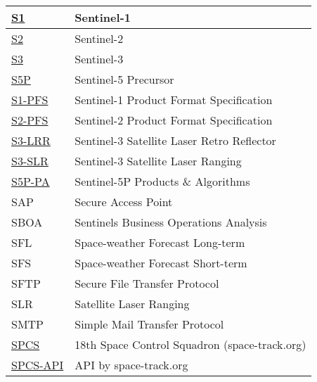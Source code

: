 \documentclass[dec_sum_main.tex]{subfiles}
\begin{document}
\begin{longtable}{|m{2.8cm}|m{10cm}|}
	\href{https://sentinels.copernicus.eu/web/sentinel/missions/sentinel-1}{S1} & Sentinel-1 \\ \hline
	\href{https://sentinels.copernicus.eu/web/sentinel/missions/sentinel-2}{S2} & Sentinel-2 \\ \hline
	\href{https://sentinels.copernicus.eu/web/sentinel/missions/sentinel-3}{S3} & Sentinel-3 \\ \hline
    \href{https://sentinels.copernicus.eu/web/sentinel/missions/sentinel-5p}{S5P} & Sentinel-5 Precursor \\ \hline
	\href{https://sentinels.copernicus.eu/documents/247904/1877131/S1-RS-MDA-52-7441-3-9-2_Sentinel-1ProductSpecification.pdf/4f4488ef-60ad-52cb-160c-71ebdf6ca820?t=1641274625444}{S1-PFS} & Sentinel-1 Product Format Specification\\ \hline
	\href{https://sentinels.copernicus.eu/documents/247904/685211/S2-PDGS-TAS-DI-PSD-V14.9.pdf/3d3b6c9c-4334-dcc4-3aa7-f7c0deffbaf7?t=1643013091529}{S2-PFS} & Sentinel-2 Product Format Specification\\ \hline
	\href{https://sentinels.copernicus.eu/web/sentinel/technical-guides/sentinel-3-altimetry/instrument/lrr}{S3-LRR} & Sentinel-3 Satellite Laser Retro Reflector\\ \hline	
	\href{https://sentinels.copernicus.eu/web/sentinel/technical-guides/sentinel-3-altimetry/pod/slr-tracking}{S3-SLR} & Sentinel-3 Satellite Laser Ranging\\ \hline
    \href{https://sentinels.copernicus.eu/web/sentinel/technical-guides/sentinel-5p/products-algorithms}{S5P-PA} & Sentinel-5P Products \& Algorithms\\ \hline
    SAP & Secure Access Point \\ \hline
    SBOA & Sentinels Business Operations Analysis \\ \hline
	SFL & Space-weather Forecast Long-term \\ \hline
    SFS & Space-weather Forecast Short-term \\ \hline
    SFTP & Secure File Transfer Protocol \\ \hline
	SLR & Satellite Laser Ranging \\ \hline
	SMTP & Simple Mail Transfer Protocol \\ \hline
	\href{https://www.space-track.org/}{SPCS} & 18th Space Control Squadron (space-track.org) \\ \hline
	\href{https://www.space-track.org/documentation#/api}{SPCS-API} & API by space-track.org \\ \hline

\end{longtable}
\end{document}
